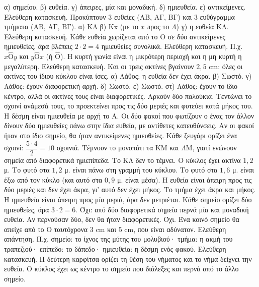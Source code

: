  α) σημείου. β) ευθεία. γ) άπειρες, μία και μοναδική. δ) ημιευθεία. ε) αντικείμενες.
 Ελεύθερη κατασκευή. Προκύπτουν $3$ ευθείες ($\mathrm{ΑΒ}$, $\mathrm{ΑΓ}$, $\mathrm{ΒΓ}$) και $3$ ευθύγραμμα τμήματα ($\mathrm{ΑΒ}$, $\mathrm{ΑΓ}$, $\mathrm{ΒΓ}$).
 α) $\mathrm{ΚΛ}$ \quad β) $\mathrm{Κx}$ (με το $x$ προς το $\Lambda$) \quad γ) η ευθεία $\mathrm{ΚΛ}$.
 Ελεύθερη κατασκευή. Κάθε ευθεία χωρίζεται από το $\mathrm{Ο}$ σε δύο αντικείμενες ημιευθείες, άρα βλέπεις $2\cdot2=4$ ημιευθείες συνολικά.
 Ελεύθερη κατασκευή. Π.χ. $x\hat{\mathrm{Ο}}y$ και $y\hat{\mathrm{Ο}}x$ (ή $\hat{\mathrm{Ο}}$). Η κυρτή γωνία είναι η μικρότερη περιοχή και η μη κυρτή η μεγαλύτερη.
 Ελεύθερη κατασκευή. Και οι τρεις ακτίνες βγαίνουν $2{,}5$ cm: όλες οι ακτίνες του ίδιου κύκλου είναι ίσες.
 α) Λάθος: η ευθεία δεν έχει άκρα. β) Σωστό. γ) Λάθος: έχουν διαφορετική αρχή. δ) Σωστό. ε) Σωστό. στ) Λάθος: έχουν το ίδιο κέντρο, αλλά οι ακτίνες τους είναι διαφορετικές.
 Αρκούν δύο παλούκια. Τεντώνει το σχοινί ανάμεσά τους, το προεκτείνει προς τις δύο μεριές και φυτεύει κατά μήκος του.
 Η δέσμη είναι ημιευθεία με αρχή το $\mathrm{Α}$. Οι δύο φακοί που φωτίζουν ο ένας τον άλλον δίνουν δύο ημιευθείες πάνω στην ίδια ευθεία, με αντίθετες κατευθύνσεις. Αν οι φακοί ήταν στο ίδιο σημείο, θα ήταν αντικείμενες ημιευθείες.
 Κάθε ζευγάρι ορίζει ένα σχοινί: $\dfrac{5\cdot4}{2}=10$ σχοινιά.
 Τέμνουν το μονοπάτι τα $\mathrm{ΚΜ}$ και $\Lambda\mathrm{Μ}$, γιατί ενώνουν σημεία από διαφορετικά ημιεπίπεδα. Το $\mathrm{ΚΛ}$ δεν το τέμνει.
 Ο κύκλος έχει ακτίνα $1{,}2$ μ. Το φυτό στα $1{,}2$ μ. είναι πάνω στη γραμμή του κύκλου. Το φυτό στα $1{,}6$ μ. είναι έξω από τον κύκλο (και αυτό στα $0{,}9$ μ. είναι μέσα).
 Η ευθεία είναι άπειρη προς τις δύο μεριές και δεν έχει άκρα, γι' αυτό δεν έχει μήκος. Το τμήμα έχει άκρα και μήκος. Η ημιευθεία είναι άπειρη προς μία μεριά, άρα δεν μετριέται.
 Κάθε σημείο ορίζει δύο ημιευθείες, άρα $3\cdot2=6$.
 Όχι: από δύο διαφορετικά σημεία περνά μία και μοναδική ευθεία. Αν περνούσαν δύο, δεν θα ήταν διαφορετικές.
 Όχι. Ένα κοινό σημείο θα απείχε από το $\mathrm{Ο}$ ταυτόχρονα $3$ cm και $5$ cm, που είναι αδύνατον.
 Ελεύθερη απάντηση. Π.χ. σημείο: το ίχνος της μύτης του μολυβιού· τμήμα: η ακμή του τραπεζιού· επίπεδο: το δάπεδο· ημιευθεία: η δέσμη ενός φακού.
 Ελεύθερη κατασκευή. Η δεύτερη καρφίτσα ορίζει τη θέση του νήματος και το νήμα δείχνει την ευθεία. Ο κύκλος έχει ως κέντρο το σημείο που διάλεξες και περνά από το άλλο σημείο.
